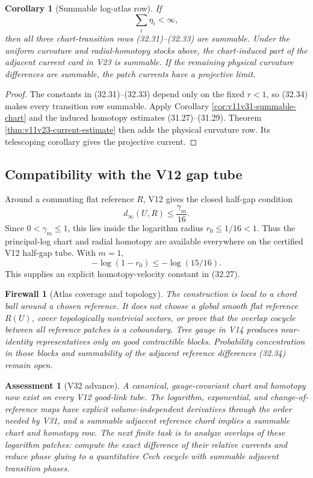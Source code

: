 \documentclass[11pt]{article}
\newtheorem{corollary}[theorem]{Corollary}
\newtheorem{assessment}[theorem]{Assessment}
\newtheorem{firewall}[theorem]{Firewall}
\begin{document}
\begin{corollary}[Summable log-atlas row]
\label{cor:v11v32-summable-atlas}
If
\[
 \sum_i\eta_i<\infty,
 \tag{32.34}
\]
then all three chart-transition rows (32.31)--(32.33) are summable.
Under the uniform curvature and radial-homotopy stocks above, the
chart-induced part of the adjacent current card in V23 is summable.
If the remaining physical curvature differences are summable, the
patch currents have a projective limit.
\end{corollary}

\begin{proof}
The constants in (32.31)--(32.33) depend only on the fixed \(r<1\), so
(32.34) makes every transition row summable.  Apply Corollary
\ref{cor:v11v31-summable-chart} and the induced homotopy estimates
(31.27)--(31.29).  Theorem \ref{thm:v11v23-current-estimate} then adds
the physical curvature row.  Its telescoping corollary gives the
projective current.
\end{proof}

\subsection{Compatibility with the V12 gap tube}

Around a commuting flat reference \(R\), V12 gives the closed half-gap
condition
\[
 d_\infty(U,R)\leq\frac{\gamma_m}{16}.
 \tag{32.35}
\]
Since \(0<\gamma_m\leq1\), this lies inside the logarithm radius
\(r_0\leq1/16<1\).  Thus the principal-log chart and radial homotopy are
available everywhere on the certified V12 half-gap tube.  With
\(m=1\),
\[
 -\log(1-r_0)\leq-\log(15/16).
 \tag{32.36}
\]
This supplies an explicit homotopy-velocity constant in (32.27).

\begin{firewall}[Atlas coverage and topology]
\label{fw:v11v32-coverage}
The construction is local to a chord ball around a chosen reference.
It does not choose a global smooth flat reference \(R(U)\), cover
topologically nontrivial sectors, or prove that the overlap cocycle
between all reference patches is a coboundary.  Tree gauge in V14
produces near-identity representatives only on good contractible
blocks.  Probability concentration in those blocks and summability of
the adjacent reference differences (32.34) remain open.
\end{firewall}

\begin{assessment}[V32 advance]
\label{ass:v11v32}
A canonical, gauge-covariant chart and homotopy now exist on every V12
good-link tube.  The logarithm, exponential, and change-of-reference
maps have explicit volume-independent derivatives through the order
needed by V31, and a summable adjacent reference chord implies a
summable chart and homotopy row.  The next finite task is to analyze
overlaps of these logarithm patches: compute the exact difference of
their relative currents and reduce phase gluing to a quantitative
Cech cocycle with summable adjacent transition phases.
\end{assessment}
\end{document}
